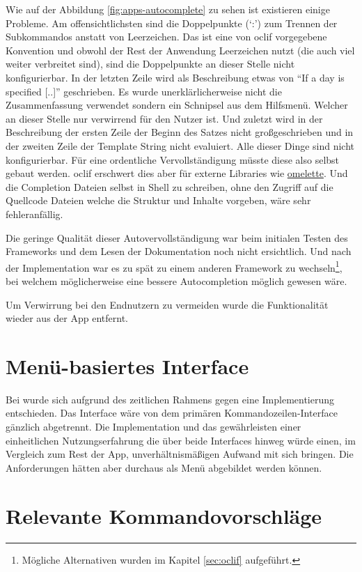 \documentclass[oneside,bibliography=totocnumbered,BCOR=5mm]{scrbook}
\begin{document}
Wie auf der Abbildung \ref{fig:apps-autocomplete} zu sehen ist existieren
einige Probleme. Am offensichtlichsten sind die Doppelpunkte (`:') zum Trennen
der Subkommandos anstatt von Leerzeichen. Das ist eine von oclif vorgegebene
Konvention und obwohl der Rest der Anwendung Leerzeichen nutzt (die auch
viel weiter verbreitet sind), sind die Doppelpunkte an dieser Stelle nicht
konfigurierbar. In der letzten Zeile wird als Beschreibung etwas von ``If a
day is specified [..]'' geschrieben. Es wurde unerklärlicherweise nicht die
Zusammenfassung verwendet sondern ein Schnipsel aus dem Hilfsmenü. Welcher
an dieser Stelle nur verwirrend für den Nutzer ist. Und zuletzt wird in der
Beschreibung der ersten Zeile der Beginn des Satzes nicht großgeschrieben und
in der zweiten Zeile der Template String nicht evaluiert. Alle dieser Dinge
sind nicht konfigurierbar. Für eine ordentliche Vervollständigung müsste diese
also selbst gebaut werden. oclif erschwert dies aber für externe Libraries wie
\href{https://github.com/f/omelette/issues/52}{omelette}. Und die Completion
Dateien selbst in Shell zu schreiben, ohne den Zugriff auf die Quellcode Dateien
welche die Struktur und Inhalte vorgeben, wäre sehr fehleranfällig.

Die geringe Qualität dieser Autovervollständigung war beim initialen Testen
des Frameworks und dem Lesen der Dokumentation noch nicht ersichtlich.
Und nach der Implementation war es zu spät zu einem anderen Framework zu
wechseln\footnote{Mögliche Alternativen wurden im Kapitel \ref{sec:oclif}
aufgeführt.}, bei welchem möglicherweise eine bessere Autocompletion möglich
gewesen wäre.

Um Verwirrung bei den Endnutzern zu vermeiden wurde die Funktionalität wieder aus
der App entfernt.

\section{Menü-basiertes Interface}
\label{sec:impl-menu}

Bei  wurde sich aufgrund des zeitlichen Rahmens gegen
eine Implementierung entschieden. Das Interface wäre von dem primären
Kommandozeilen-Interface gänzlich abgetrennt. Die Implementation und das
gewährleisten einer einheitlichen Nutzungserfahrung die über beide Interfaces
hinweg würde einen, im Vergleich zum Rest der App, unverhältnismäßigen Aufwand
mit sich bringen. Die Anforderungen hätten aber durchaus als Menü abgebildet
werden können.

\section{Relevante Kommandovorschläge}
\end{document}
